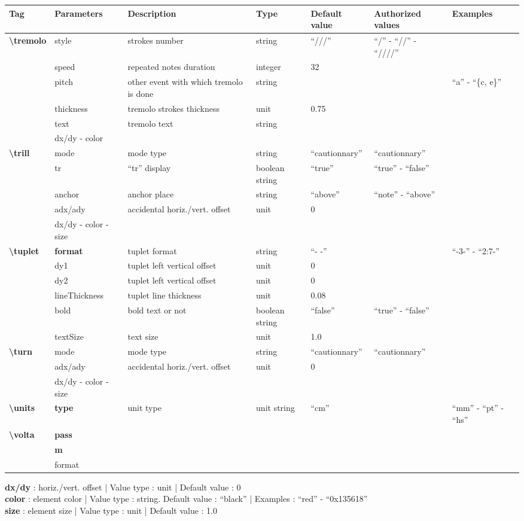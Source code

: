 \documentclass[a4paper, landscape, 10pt]{article}
\begin{document}
\begin{tabularx}{\linewidth}{p{3cm}p{3cm}p{5cm}p{3cm}p{2.5cm}p{3.5cm}p{4cm}}
    \hline
    \textbf{Tag}&\textbf{Parameters}&\textbf{Description}&\textbf{Type}&\textbf{Default value}&\textbf{Authorized values}&\textbf{Examples}\\
    \hline
    \textbf{\textbackslash{}tremolo}&style&strokes number&string&``///''&``/'' - ``//'' - ``////''&\\
    &speed&repeated notes duration&integer&32&&\\
    &pitch&other event with which tremolo is done&string&&&``a'' - ``\{c, e\}''\\
    &thickness&tremolo strokes thickness&unit&0.75&&\\
    &text&tremolo text&string&&&\\
    &dx/dy - color&&&&&\\
    \hline
    \textbf{\textbackslash{}trill}&mode&mode type&string&``cautionnary''&``cautionnary''&\\
    &tr&``tr'' display&boolean string&``true''&``true'' - ``false''&\\
    &anchor&anchor place&string&``above''&``note'' - ``above''&\\
    &adx/ady&accidental horiz./vert. offset&unit&0&&\\
    &dx/dy - color - size&&&&&\\
    \hline
    \textbf{\textbackslash{}tuplet}&\textbf{format}&tuplet format&string&``- -''&&``-3-'' - ``2:7-''\\
    &dy1&tuplet left vertical offset&unit&0&&\\
    &dy2&tuplet left vertical offset&unit&0&&\\
    &lineThickness&tuplet line thickness&unit&0.08&&\\
    &bold&bold text or not&boolean string&``false''&``true'' - ``false''&\\
    &textSize&text size&unit&1.0&&\\
    \hline
    \textbf{\textbackslash{}turn}&mode&mode type&string&``cautionnary''&``cautionnary''&\\
    &adx/ady&accidental horiz./vert. offset&unit&0&&\\
    &dx/dy - color - size&&&&&\\
    \hline
    \textbf{\textbackslash{}units}&\textbf{type}&unit type&unit string&``cm''&&``mm'' - ``pt'' - ``hs''\\
    \hline
    \textbf{\textbackslash{}volta}&\textbf{pass}&&&&&\\ %
    &\textbf{m}&&&&&\\
    &format&&&&&\\
    \hline
\end{tabularx}

\bigskip

\textbf{dx/dy} : horiz./vert. offset | Value type : unit | Default value : 0\\
\textbf{color} : element color | Value type : string. Default value : ``black'' | Examples : ``red'' - ``0x135618''\\
\textbf{size} : element size | Value type : unit | Default value : 1.0\\
    
\end{document}
